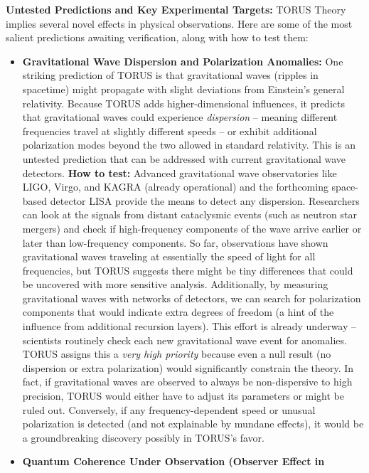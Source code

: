 \textbf{Untested Predictions and Key Experimental Targets:} TORUS Theory
implies several novel effects in physical observations. Here are some of
the most salient predictions awaiting verification, along with how to
test them:

\begin{itemize}
\item
  \textbf{Gravitational Wave Dispersion and Polarization Anomalies:} One
  striking prediction of TORUS is that gravitational waves (ripples in
  spacetime) might propagate with slight deviations from Einstein's
  general relativity. Because TORUS adds higher-dimensional influences,
  it predicts that gravitational waves could experience
  \emph{dispersion} -- meaning different frequencies travel at slightly
  different speeds -- or exhibit additional polarization modes beyond
  the two allowed in standard relativity. This is an untested prediction
  that can be addressed with current gravitational wave detectors.
  \textbf{How to test:} Advanced gravitational wave observatories like
  LIGO, Virgo, and KAGRA (already operational) and the forthcoming
  space-based detector LISA provide the means to detect any dispersion.
  Researchers can look at the signals from distant cataclysmic events
  (such as neutron star mergers) and check if high-frequency components
  of the wave arrive earlier or later than low-frequency components. So
  far, observations have shown gravitational waves traveling at
  essentially the speed of light for all frequencies, but TORUS suggests
  there might be tiny differences that could be uncovered with more
  sensitive analysis​. Additionally, by measuring gravitational waves
  with networks of detectors, we can search for polarization components
  that would indicate extra degrees of freedom (a hint of the influence
  from additional recursion layers). This effort is already underway --
  scientists routinely check each new gravitational wave event for
  anomalies. TORUS assigns this a \emph{very high priority} because even
  a null result (no dispersion or extra polarization) would
  significantly constrain the theory​. In fact, if gravitational waves
  are observed to always be non-dispersive to high precision, TORUS
  would either have to adjust its parameters or might be ruled out.
  Conversely, if any frequency-dependent speed or unusual polarization
  is detected (and not explainable by mundane effects), it would be a
  groundbreaking discovery possibly in TORUS's favor.
\item
  \textbf{Quantum Coherence Under Observation (Observer Effect in
}
\end{itemize}
